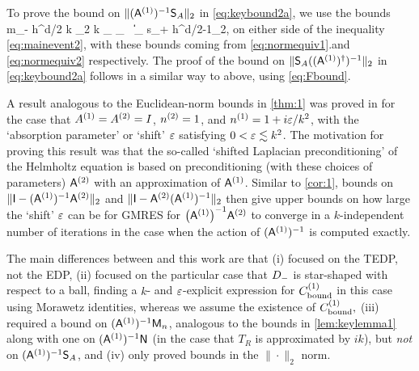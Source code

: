 To prove the bound on  $\|(\mathsf{A}^{(1)})^{-1}\mathsf{S}_A\|_{2}$ in \cref{eq:keybound2a}, we use the bounds 
\beqs
m_- h^{d/2} k \N{\tbu}_2 \leq k _{\LtD} \leq {}_{\HokD}
\,\tand\,
\big\|\nabla {}\big\|_{\LtD} \leq s_+ h^{d/2-1}\N{\fvec}_2,
\eeqs
on either side of the inequality \cref{eq:mainevent2}, with these bounds coming from \cref{eq:normequiv1}.and \cref{eq:normequiv2} respectively. The proof of the bound on 
$\|\mathsf{S}_A((\mathsf{A}^{(1)})^\dagger)^{-1}\|_{2}$ in \cref{eq:keybound2a} follows in a similar way to above, using \cref{eq:Fbound}.
\epf

A result analogous to the Euclidean-norm bounds in \cref{thm:1} was proved in \cite{GaGrSp:15} for the case that ${A}^{(1)}= {A}^{(2)}= I$, ${n}^{(2)}= 1$, and ${n}^{(1)} = 1 + i\varepsilon/k^2$, with the `absorption parameter' or `shift' $\varepsilon$ satisfying $0<\varepsilon\lesssim k^2$. The motivation for proving this result was that the so-called `shifted Laplacian preconditioning' of the Helmholtz equation is based on preconditioning (with these choices of parameters) $\mathsf{A}^{(2)}$ with an approximation of $\mathsf{A}^{(1)}$. Similar to \cref{cor:1}, bounds on $\|\mathsf{I} -  (\mathsf{A}^{(1)})^{-1}\mathsf{A}^{(2)} \|_2$ and 
$\|\mathsf{I} - \mathsf{A}^{(2)}  (\mathsf{A}^{(1)})^{-1}\|_2$
 then give upper bounds on how large the `shift' $\varepsilon$ can be for GMRES for $\AmatoI\Amatt$ to converge in a $k$-independent number of iterations in the case when the action of $(\mathsf{A}^{(1)})^{-1}$ is computed exactly.

The main differences between \cite{GaGrSp:15} and this work are that (i)  \cite{GaGrSp:15} focused on the TEDP, not the EDP,
(ii) \cite{GaGrSp:15} focused on the particular case that $D_{-}$ is star-shaped with respect to a ball, finding a $k$- and $\varepsilon$-explicit expression for $C^{(1)}_{\rm bound}$ in this case using Morawetz identities, whereas we assume the existence of $C_{\mathrm{bound}}^{(1)},$
(iii) \cite{GaGrSp:15} required a bound on 
$(\mathsf{A}^{(1)})^{-1}\mathsf{M}_{n}$, analogous to the bounds in \cref{lem:keylemma1} along with one on $(\mathsf{A}^{(1)})^{-1}\mathsf{N}$ (in the case that $T_R$ is approximated by $i k$), but \emph{not} on 
$(\mathsf{A}^{(1)})^{-1}\mathsf{S}_{A}$, and (iv) \cite{GaGrSp:15} only proved bounds in the $\|\cdot\|_2$ norm.
\ere


